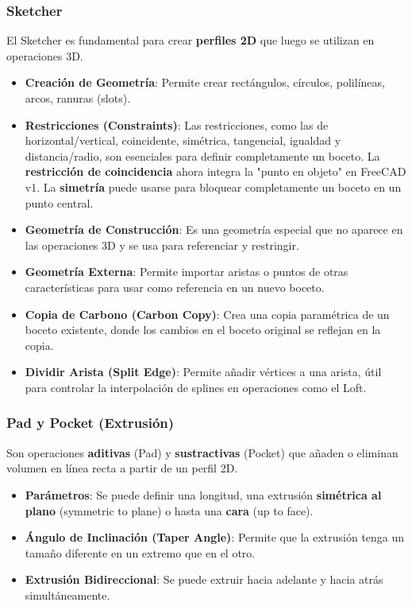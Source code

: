 \documentclass{article}
\begin{document}
\subsubsection*{Sketcher}
El Sketcher es fundamental para crear \textbf{perfiles 2D} que luego se utilizan en operaciones 3D.
\begin{itemize}[noitemsep,topsep=0pt]
    \item \textbf{Creación de Geometría}: Permite crear rectángulos, círculos, polilíneas, arcos, ranuras (slots).
    \item \textbf{Restricciones (Constraints)}: Las restricciones, como las de horizontal/vertical, coincidente, simétrica, tangencial, igualdad y distancia/radio, son esenciales para definir completamente un boceto. La \textbf{restricción de coincidencia} ahora integra la "punto en objeto" en FreeCAD v1. La \textbf{simetría} puede usarse para bloquear completamente un boceto en un punto central.
    \item \textbf{Geometría de Construcción}: Es una geometría especial que no aparece en las operaciones 3D y se usa para referenciar y restringir.
    \item \textbf{Geometría Externa}: Permite importar aristas o puntos de otras características para usar como referencia en un nuevo boceto.
    \item \textbf{Copia de Carbono (Carbon Copy)}: Crea una copia paramétrica de un boceto existente, donde los cambios en el boceto original se reflejan en la copia.
    \item \textbf{Dividir Arista (Split Edge)}: Permite añadir vértices a una arista, útil para controlar la interpolación de splines en operaciones como el Loft.
\end{itemize}

\subsubsection*{Pad y Pocket (Extrusión)}
Son operaciones \textbf{aditivas} (Pad) y \textbf{sustractivas} (Pocket) que añaden o eliminan volumen en línea recta a partir de un perfil 2D.
\begin{itemize}[noitemsep,topsep=0pt]
    \item \textbf{Parámetros}: Se puede definir una longitud, una extrusión \textbf{simétrica al plano} (symmetric to plane) o hasta una \textbf{cara} (up to face).
    \item \textbf{Ángulo de Inclinación (Taper Angle)}: Permite que la extrusión tenga un tamaño diferente en un extremo que en el otro.
    \item \textbf{Extrusión Bidireccional}: Se puede extruir hacia adelante y hacia atrás simultáneamente.
\end{itemize}
\end{document}
